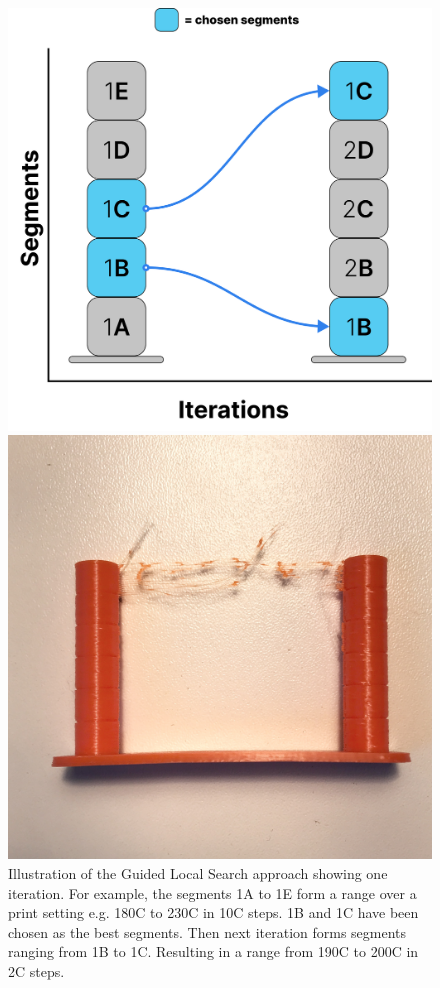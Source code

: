 \begin{figure}[!b]
  \centering
  \begin{minipage}[b]{0.4\textwidth}
    \includegraphics[width=\textwidth]{assets/local_search_illustration.jpg}
    \caption{Illustration of the Guided Local Search approach showing one iteration. For example, the segments 1A to 1E form a range over a print setting e.g. 180\textdegree C to 230\textdegree C in 10\textdegree C steps. 1B and 1C have been chosen as the best segments. Then next iteration forms segments ranging from 1B to 1C. Resulting in a range from 190\textdegree C to 200\textdegree C in 2\textdegree C steps.}
    \label{figure/local_search_illustration}
  \end{minipage}
  \hfill
  \begin{minipage}[b]{0.45\textwidth}
    \includegraphics[width=\textwidth]{assets/stringing.jpg}

\end{minipage}
\end{figure}
